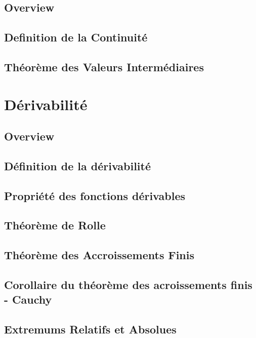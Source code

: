 \documentclass{article}
\begin{document}
\subsection{Overview}


\subsection{Definition de la Continuité}

\subsection{Théorème des Valeurs Intermédiaires}


\pagebreak
\section{Dérivabilité}
\subsection{Overview}


\subsection{Définition de la dérivabilité}

\subsection{Propriété des fonctions dérivables}

\subsection{Théorème de Rolle}

\subsection{Théorème des Accroissements Finis}

\subsection{Corollaire du théorème des acroissements finis - Cauchy}

\subsection{Extremums Relatifs et Absolues}
\end{document}
